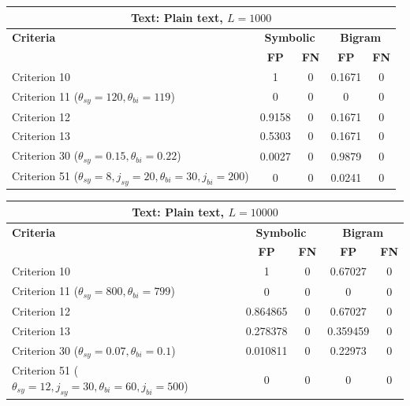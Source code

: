 \begin{center}
\renewcommand{\arraystretch}{1.2}
\setlength{\tabcolsep}{6pt}
\begin{tabular}{|l||c|c||c|c|}
\hline
\multicolumn{5}{|c|}{\textbf{Text: Plain text, $L=1000$}} \\
\hline
\textbf{Criteria} & \multicolumn{2}{c||}{\textbf{Symbolic}} & \multicolumn{2}{c|}{\textbf{Bigram}} \\
\hline
 & \textbf{FP} & \textbf{FN} & \textbf{FP} & \textbf{FN} \\
\hline
Criterion 10 & 1 & 0 & 0.1671 & 0 \\
Criterion 11 ($\theta_{sy}=120, \theta_{bi}=119$) & 0 & 0 & 0 & 0 \\
Criterion 12 & 0.9158 & 0 & 0.1671 & 0 \\
Criterion 13 & 0.5303 & 0 & 0.1671 & 0 \\
Criterion 30 ($\theta_{sy}=0.15, \theta_{bi}=0.22$) & 0.0027 & 0 & 0.9879 & 0 \\
Criterion 51 ($\theta_{sy}=8, j_{sy}=20, \theta_{bi}=30, j_{bi}=200$) & 0 & 0 & 0.0241 & 0 \\
\hline
\end{tabular}
\end{center}

\begin{center}
\renewcommand{\arraystretch}{1.2}
\setlength{\tabcolsep}{6pt}
\begin{tabular}{|l||c|c||c|c|}
\hline
\multicolumn{5}{|c|}{\textbf{Text: Plain text, $L=10000$}} \\
\hline
\textbf{Criteria} & \multicolumn{2}{c||}{\textbf{Symbolic}} & \multicolumn{2}{c|}{\textbf{Bigram}} \\
\hline
 & \textbf{FP} & \textbf{FN} & \textbf{FP} & \textbf{FN} \\
\hline
Criterion 10 & 1 & 0 & 0.67027 & 0 \\
Criterion 11 ($\theta_{sy}=800, \theta_{bi}=799$) & 0 & 0 & 0 & 0 \\
Criterion 12 & 0.864865 & 0 & 0.67027 & 0 \\
Criterion 13 & 0.278378 & 0 & 0.359459 & 0 \\
Criterion 30 ($\theta_{sy}=0.07, \theta_{bi}=0.1$) & 0.010811 & 0 & 0.22973 & 0 \\
Criterion 51 ($\theta_{sy}=12, j_{sy}=30, \theta_{bi}=60, j_{bi}=500$) & 0 & 0 & 0 & 0 \\
\hline
\end{tabular}
\end{center}

